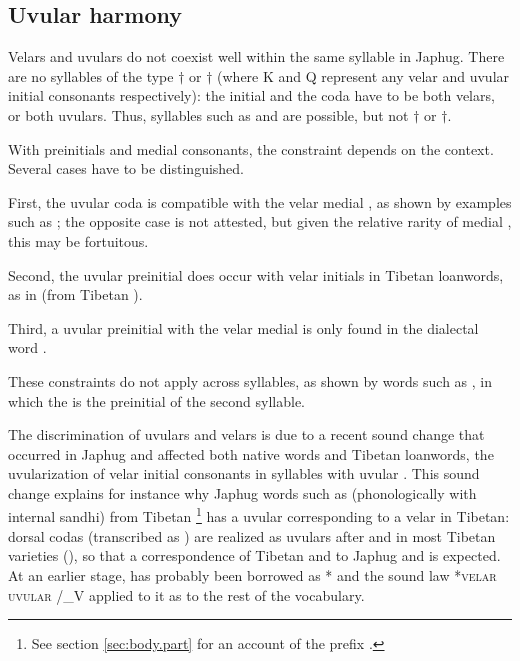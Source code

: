 \subsection{Uvular harmony} \label{sec:uvular.harmony}
Velars and uvulars do not coexist well within the same syllable in Japhug. There are no syllables of the type $\dagger$ or $\dagger$ (where K and Q  represent any velar and uvular initial consonants respectively): the initial and the coda have to be both velars, or both uvulars. Thus, syllables such as  and  are possible, but not $\dagger$ or $\dagger$. 

With preinitials and medial consonants, the constraint depends on the context. Several cases have to be distinguished.

First, the uvular coda  is compatible with the velar medial , as shown by examples such as ; the opposite case is not attested, but given the relative rarity of medial , this may be fortuitous.

Second, the uvular preinitial   does occur with velar initials in Tibetan loanwords, as in  (from Tibetan ).

Third, a uvular preinitial with the velar medial  is only found in the dialectal word .

These constraints do not apply across syllables, as shown by words such as , in which the  is the preinitial of the second syllable.

The discrimination of uvulars and velars is due to a recent sound change that occurred in Japhug and affected both native words and Tibetan loanwords, the uvularization of velar initial consonants in syllables with uvular . This sound change explains for instance why Japhug words such as  (phonologically  with internal sandhi) from Tibetan \footnote{See section \ref{sec:body.part} for an account of the prefix .} has a uvular  corresponding to a velar  in Tibetan: dorsal codas (transcribed as ) are realized as uvulars after  and  in most Tibetan varieties (\citealt{gong16amdo}), so that a correspondence of Tibetan  and  to Japhug  and  is expected. At an earlier stage,  has probably been borrowed as * and the sound law *\textsc{velar} \fl{} \textsc{uvular} /\_V applied to it as to the rest of the vocabulary.
